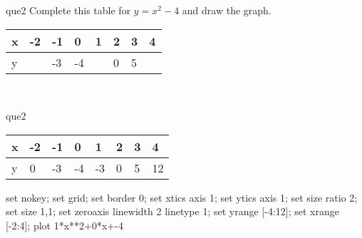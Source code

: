 \documentclass[13.5pt, varwidth=true]{beamer}
\begin{document}
\begin{frame}[shrink=19,fragile]
	\begin{beamercolorbox}[rounded=true, left, shadow=true,wd=14.8cm]{que2}
		 Complete this table for $y = x^{2} - 4$ and draw the graph. \\[0.3cm] \renewcommand{\arraystretch}{1.2}\begin{tabular}{|C|C|C|C|C|C|C|C|} \hline x & -2 & -1 & 0 & 1 & 2 & 3 & 4 \\ \hline y &  & -3 & -4 &  & 0 & 5 & \\ \hline \end{tabular}\\[0.3cm]
	\end{beamercolorbox}
\end{frame}
\begin{frame}[shrink=19,fragile]
	\begin{beamercolorbox}[rounded=true, left, shadow=true,wd=14.8cm]{que2}
		\renewcommand{\arraystretch}{1.2}\begin{tabular}{|C|C|C|C|C|C|C|C|} \hline x & -2 & -1 & 0 & 1 & 2 & 3 & 4 \\ \hline y & 0 & -3 & -4 & -3 & 0 & 5 & 12\\ \hline \end{tabular}\begin{gnuplot}[terminal=pdf] set nokey; set grid; set border 0; set xtics axis 1; set ytics axis 1; set size ratio 2; set size 1,1; set zeroaxis linewidth 2 linetype 1; set yrange [-4:12]; set xrange [-2:4]; plot 1*x**2+0*x+-4 \end{gnuplot}
	\end{beamercolorbox}
\end{frame}
\end{document}
